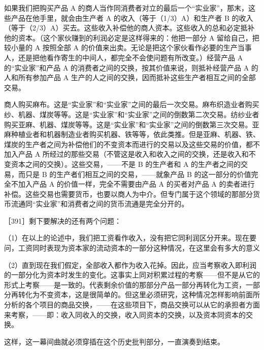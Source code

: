 如果我们把购买产品 A 的商人当作同消费者对立的最后一个“实业家”，那末，这些产品在他手里，就会由生产者 A 的收入（等于（1/3）A）和生产者 B 的收入（等于（2/3）A）买去。这些收入补偿他的商人资本。这些收入的总和必定抵补他的资本。（这个家伙赚到的利润必定是这样得来的：他把一部分 A 留给自己，把较小量的 A 按照全部 A 的价值来出卖。无论是把这个家伙看作必要的生产当事人，还是把他看作寄生的中间人，都完全不会使问题有所改变。）经营产品 A 的“实业家”和产品 A 的消费者之间的交换，按其价值来说，则抵补经营产品 A 的人和所有参加产品 A 生产的人之间的交换，因而抵补这些生产者相互之间的全部交易。

商人购买麻布。这是“实业家”和“实业家”之间的最后一次交易。麻布织造业者购买纱、机器、煤炭等等。这是“实业家”和“实业家”之间的倒数第二次交易。纺纱业者购买亚麻、机器、煤炭等等。这是“实业家”和“实业家”之间的倒数第三次交易。亚麻种植业者和机器制造业者购买机器、铁等等，依此类推。但是亚麻、机器、铁、煤炭的生产者之间为补偿他们的不变资本而进行的交易以及这些交易的价值，都不加入产品 A 所经过的那些交易（不管这是收入和收入之间的交换，还是收入和不变资本之间的交换）。这些交易，——不是 B 的生产者和 A 的生产者之间的交易，而只是 B 的生产者们相互之间的交易，——就象产品 B 的这一部分的价值完全不加入产品 A 的价值一样，完全不需要由产品 A 的买者对产品 A 的卖者进行补偿。这些交易也需要货币，也要以商人为中介。但专门属于这个领域的那部分货币流通同“实业家”和消费者之间的货币流通是完全分开的。\fontbox{\}~}

［391］剩下要解决的还有两个问题：

（1）在以上的论述中，我们把工资看作收入，没有把它同利润区分开来。现在要问，工资同时表现为资本家的流动资本的一部分这种情况，在这里会有多大的意义

（2）直到现在我们假定，全部收入都作为收入花掉。因此，应当考察收入即利润的一部分化为资本时发生的变化。这事实上同对积累过程的考察——但不是从它的形式上考察——是一致的。代表剩余价值的那部分产品一部分再转化为工资，一部分再转化为不变资本，这是很简单的。但这里必须研究，这种情况怎样影响前面所分析的各个项目的商品交换，——在这些项目下，商品交换可以从它的承担者方面来考察，——即：收入同收入的交换，收入同资本的交换，以及资本同资本的交换。\fontbox{\}~}

\fontbox{~\{}这样，这一幕间曲就必须穿插在这个历史批判部分，一直演奏到结束。\fontbox{\}~}

